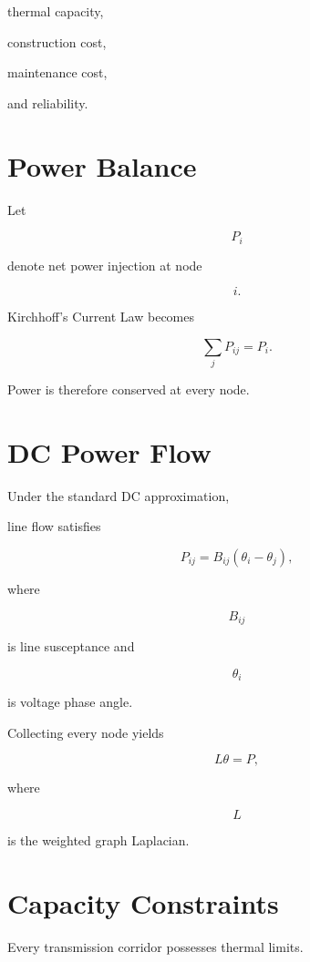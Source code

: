 \documentclass[11pt,fleqn]{book}
\numberwithin{equation}{chapter}
\theoremstyle{plain}
\theoremstyle{definition}
\theoremstyle{remark}
\begin{document}
thermal capacity,

construction cost,

maintenance cost,

and reliability.


\section{Power Balance}

Let

\[
P_i
\]

denote net power injection at node

\[
i.
\]

Kirchhoff's Current Law becomes

\[
\boxed{
\sum_j
P_{ij}
=
P_i.
}
\]

Power is therefore conserved at every node.


\section{DC Power Flow}

Under the standard DC approximation,

line flow satisfies

\[
\boxed{
P_{ij}
=
B_{ij}
(\theta_i-\theta_j),
}
\]

where

\[
B_{ij}
\]

is line susceptance and

\[
\theta_i
\]

is voltage phase angle.

Collecting every node yields

\[
L\theta=P,
\]

where

\[
L
\]

is the weighted graph Laplacian.


\section{Capacity Constraints}

Every transmission corridor possesses thermal limits.
\end{document}
